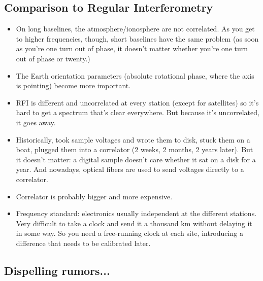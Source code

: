 \documentclass[a4paper]{article}
\begin{document}
\subsection{Comparison to Regular Interferometry}

\begin{itemize}
\item On long baselines, the atmosphere/ionosphere are not correlated. As you get to higher frequencies, though, short baselines have the same problem (as soon as you're one turn out of phase, it doesn't matter whether you're one turn out of phase or twenty.) 
\item The Earth orientation parameters (absolute rotational phase, where the axis is pointing) become more important. 
\item RFI is different and uncorrelated at every station (except for satellites) so it's hard to get a spectrum that's clear everywhere. But because it's uncorrelated, it goes away. 
\item Historically, took sample voltages and wrote them to disk, stuck them on a boat, plugged them into a correlator (2 weeks, 2 months, 2 years later). But it doesn't matter: a digital sample doesn't care whether it sat on a disk for a year. And nowadays, optical fibers are used to send voltages directly to a correlator.
\item Correlator is probably bigger and more expensive. 
\item Frequency standard: electronics usually independent at the different stations. Very difficult to take a clock and send it a thousand km without delaying it in some way. So you need a free-running clock at each site, introducing a difference that needs to be calibrated later. 
\end{itemize}

\subsection{Dispelling rumors...}
\end{document}
